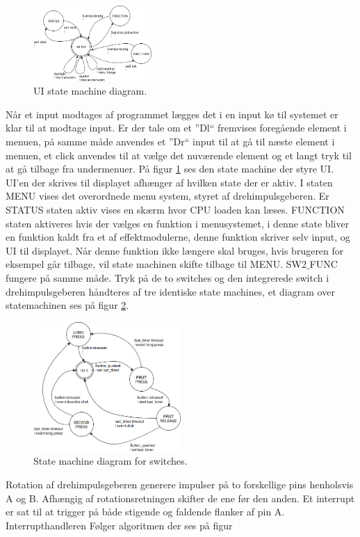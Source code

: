 \begin{figure} 
	\centering 
	\includegraphics[width=4.5cm]{billeder/ui_statemachine.png} 
	\caption{UI state machine diagram. } 
	\label{fig:uistatemachine} 
\end{figure}

Når et input  modtages af programmet lægges det i en input kø til systemet er klar til at modtage input. Er der tale om et ''Dl`` fremvises foregående element i menuen, på samme måde anvendes et ''Dr`` input til at gå til næste element i menuen, et click anvendes til at vælge det nuværende element og et langt tryk til at gå tilbage fra undermenuer.
På figur \ref{fig:uistatemachine} ses den state machine der styre UI.
UI'en der skrives til displayet afhænger af hvilken state der er aktiv.
I staten MENU vises det overordnede menu system, styret af drehimpulsgeberen. 
Er STATUS staten aktiv vises en skærm hvor CPU loaden kan læses.
FUNCTION staten aktiveres hvis der vælges en funktion i menusystemet, i denne state bliver en funktion kaldt fra et af effektmodulerne, denne funktion skriver selv input, og  UI til displayet.
Når denne funktion ikke længere skal bruges, hvis brugeren for eksempel går tilbage, vil state machinen skifte tilbage til MENU.
SW2$\_$FUNC fungere på samme måde. \newline
Tryk på de to switches og den integrerede switch i drehimpulsgeberen håndteres af tre identiske state machines, et diagram over statemachinen ses på figur \ref{fig:SW_statemachine}.
\begin{figure}[!ht]
	\centering 
	\includegraphics[width=0.5\textwidth]{billeder/buttons_statemachine.png} 
	\caption{State machine diagram for switches. } 
	\label{fig:SW_statemachine} 
\end{figure}
Rotation af drehimpulsgeberen generere impulser på to forskellige pins henholsvis A og B.
Afhængig af rotationsretningen skifter de ene før den anden. 
Et interrupt er sat til at trigger på både stigende og faldende flanker af pin A.
Interrupthandleren Følger algoritmen der ses på figur
